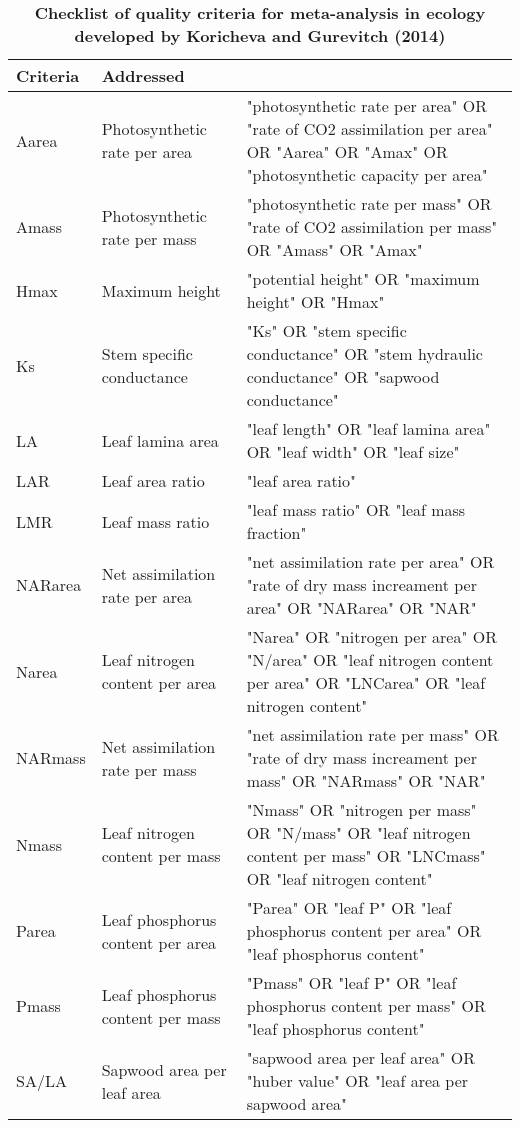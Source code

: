 \documentclass[a4paper]{article}\usepackage[]{graphicx}\usepackage[]{color}
\begin{document}
\begin{appendices}
\begin{table}[ht]
\centering
\caption{\textbf{Checklist of quality criteria for meta-analysis in ecology developed by Koricheva and Gurevitch (2014)} }
\label{TableA2}
\vspace{0.5cm}
\begin{tabular}{p{3cm}p{3cm}p{8cm}}
  \hline
Criteria & Addressed & \\
  \hline
Aarea & Photosynthetic rate per area & "photosynthetic rate per area" OR "rate of CO2 assimilation per area" OR "Aarea" OR "Amax" OR "photosynthetic capacity per area" \\
  Amass & Photosynthetic rate per mass & "photosynthetic rate per mass" OR "rate of CO2 assimilation per mass" OR "Amass" OR "Amax" \\
  Hmax & Maximum height & "potential height" OR "maximum height" OR "Hmax" \\
  Ks & Stem specific conductance & "Ks" OR "stem specific conductance" OR "stem hydraulic conductance" OR "sapwood conductance" \\
  LA & Leaf lamina area & "leaf length" OR "leaf lamina area" OR "leaf width" OR "leaf size" \\
  LAR & Leaf area ratio & "leaf area ratio" \\
  LMR & Leaf mass ratio & "leaf mass ratio" OR "leaf mass fraction" \\
  NARarea & Net assimilation rate per area &  "net assimilation rate per area" OR "rate of dry mass increament per area" OR "NARarea" OR "NAR" \\
  Narea & Leaf nitrogen content per area & "Narea" OR "nitrogen per area" OR "N/area" OR "leaf nitrogen content per area" OR "LNCarea" OR "leaf nitrogen content" \\
  NARmass & Net assimilation rate per mass &  "net assimilation rate per mass" OR "rate of dry mass increament per mass" OR "NARmass" OR "NAR" \\
  Nmass & Leaf nitrogen content per mass & "Nmass" OR "nitrogen per mass" OR "N/mass" OR "leaf nitrogen content per mass" OR "LNCmass" OR "leaf nitrogen content" \\
  Parea & Leaf phosphorus content per area & "Parea" OR "leaf P" OR  "leaf phosphorus content per area"  OR "leaf phosphorus content" \\
  Pmass & Leaf phosphorus content per mass & "Pmass" OR "leaf P" OR  "leaf phosphorus content per mass" OR "leaf phosphorus content" \\
  SA/LA & Sapwood area per leaf area & "sapwood area per leaf area" OR "huber value" OR "leaf area per sapwood area" \\

\end{tabular}
\end{table}
\end{appendices}
\end{document}
